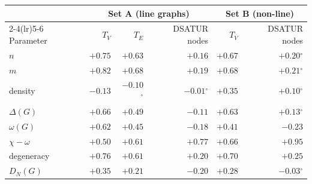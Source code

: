 \begin{tabular}{lrrrrr}
\toprule
 & \multicolumn{3}{c}{Set A (line graphs)} & \multicolumn{2}{c}{Set B (non-line)}\\
\cmidrule(lr){2-4}\cmidrule(lr){5-6}
Parameter & $T_V$ & $T_E$ & DSATUR nodes & $T_V$ & DSATUR nodes\\
\midrule
$n$ & $+0.75$ & $+0.63$ & $+0.16$ & $+0.67$ & $+0.20$$^{\circ}$\\
$m$ & $+0.82$ & $+0.68$ & $+0.19$ & $+0.68$ & $+0.21$$^{\circ}$\\
density & $-0.13$ & $-0.10$$^{\circ}$ & $-0.01$$^{\circ}$ & $+0.35$ & $+0.10$$^{\circ}$\\
$\Delta(G)$ & $+0.66$ & $+0.49$ & $-0.11$ & $+0.63$ & $+0.13$$^{\circ}$\\
$\omega(G)$ & $+0.62$ & $+0.45$ & $-0.18$ & $+0.41$ & $-0.23$\\
$\chi-\omega$ & $+0.50$ & $+0.61$ & $+0.77$ & $+0.66$ & $+0.95$\\
degeneracy & $+0.76$ & $+0.61$ & $+0.20$ & $+0.70$ & $+0.25$\\
$D_N(G)$ & $+0.35$ & $+0.21$ & $-0.20$ & $+0.28$ & $-0.03$$^{\circ}$\\
\bottomrule
\end{tabular}
